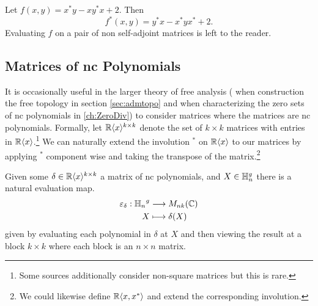 \begin{example}
  Let \(f(x,y) = x^*y - x y^* x +2\). Then
  \[
    f^*(x,y) = y^*x - x^*yx^* + 2.
  \]
  Evaluating \(f\) on a pair of non self-adjoint matrices is left to the reader.
\end{example}

\subsection{Matrices of nc Polynomials}

It is occasionally useful in the larger theory of free analysis (\eg{} when
construction the free topology in section \ref{sec:admtopo} and when
characterizing the zero sets of nc polynomials in \ref{ch:ZeroDiv}) to consider
matrices where the matrices are nc polynomials. Formally,
let \(\mathbb{R} \langle x \rangle ^{k\times k}\) denote the set of \(k \times k\) matrices
with entries in \(\mathbb{R} \langle x \rangle \).\footnote{Some sources additionally
  consider non-square matrices but this is rare.}
We can naturally extend the involution \(^*\) on \(\mathbb{R} \langle x \rangle \) to
our matrices by applying \(^*\) component wise and taking the transpose of the
matrix.\footnote{We could likewise define
  \(\mathbb{R} \langle x,x^* \rangle\) and extend the corresponding involution.}

Given some \(\delta \in \mathbb{R} \langle x \rangle ^{k \times k}\) a matrix of nc
polynomials, and \(X \in \mathbb{H}_n^g\) there is a natural evaluation map.
\begin{align*}
  \varepsilon_\delta: {\mathbb{H}_n}^g &\longrightarrow M_{nk}(\mathbb{C}) \\
             X &\longmapsto \delta(X)
\end{align*}
given by evaluating each polynomial in \(\delta\) at \(X\) and then viewing the
result at a block \(k \times k\) where each block is an \(n \times n\) matrix.

